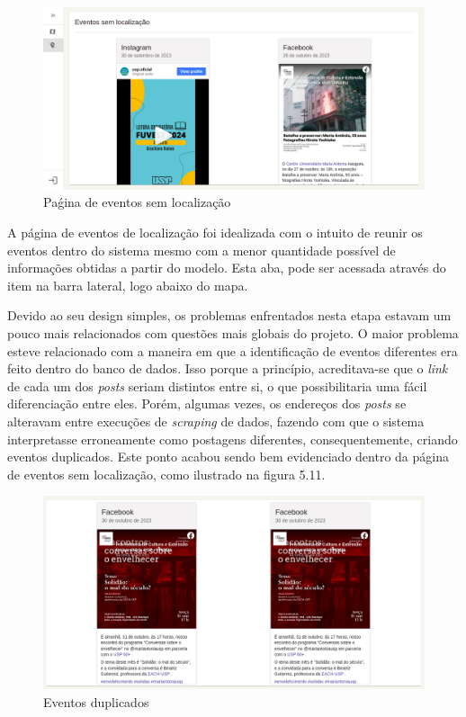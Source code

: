 \begin{figure}[h]
    \centering
    \includegraphics[width=1\textwidth]{figuras/locationlessPage.png}
    \caption{Paǵina de eventos sem localização}
\end{figure}

A página de eventos de localização foi idealizada com o intuito de reunir os
eventos dentro do sistema mesmo com a menor quantidade possível de informações
obtidas a partir do modelo. Esta aba, pode ser acessada através do item na
barra lateral, logo abaixo do mapa.

Devido ao seu design simples, os problemas enfrentados nesta etapa estavam um
pouco mais relacionados com questões mais globais do projeto. O maior problema
esteve relacionado com a maneira em que a identificação de eventos diferentes
era feito dentro do banco de dados. Isso porque a princípio, acreditava-se que
o \textit{link} de cada um dos \textit{posts} seriam distintos entre si, o que
possibilitaria uma fácil diferenciação entre eles. Porém, algumas vezes, os
endereços dos \textit{posts} se alteravam entre execuções de \textit{scraping}
de dados, fazendo com que o sistema interpretasse erroneamente como postagens diferentes,
consequentemente, criando eventos duplicados. Este ponto acabou sendo bem
evidenciado dentro da página de eventos sem localização, como ilustrado na
figura 5.11.

\begin{figure}[h]
    \centering
    \includegraphics[width=1\textwidth]{figuras/duplicatedEvents.png}
    \caption{Eventos duplicados}
\end{figure}

